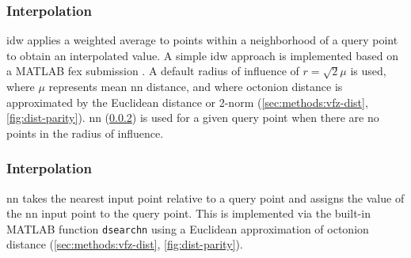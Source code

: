 \documentclass[preprint,12pt]{elsarticle}
\begin{document}
\subsubsection{ Interpolation}
\label{sec:methods:interp:idw}


\Gls{idw} applies a weighted average to points within a neighborhood of a query point to obtain an interpolated value. A simple \gls{idw} approach is implemented based on a MATLAB \gls{fex} submission \cite{tovarInverseDistanceWeight2020}. A default radius of influence of $r=\sqrt{2} \mu$ is used, where $\mu$ represents mean \gls{nn} distance, and where octonion distance is approximated by the Euclidean distance or 2-norm (\cref{sec:methods:vfz-dist}, \cref{fig:dist-parity}). \gls{nn} (\cref{sec:methods:interp:nn}) is used for a given query point when there are no points in the radius of influence.

\subsubsection{ Interpolation}
\label{sec:methods:interp:nn}


\Gls{nn} takes the nearest input point relative to a query point and assigns the value of the \gls{nn} input point to the query point. This is implemented via the built-in MATLAB function \texttt{dsearchn} using a Euclidean approximation of octonion distance (\cref{sec:methods:vfz-dist}, \cref{fig:dist-parity}).

\end{document}
